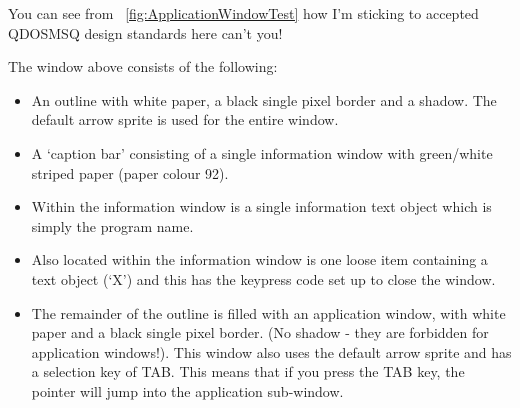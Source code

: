 You can see from \figurename~\ref{fig:ApplicationWindowTest} how I'm sticking to accepted QDOSMSQ design     standards here can't you!

The window above consists of the following:
\begin{itemize}[itemsep=0pt]

\item{}An outline with white paper, a black single pixel border and a
        shadow. The default arrow sprite is used for the entire window.

\item{}A `caption bar' consisting of a single information window with
        green/white striped paper (paper colour 92).

\item{}Within the information window is a single information text
        object which is simply the program name.

\item{}Also located within the information window is one loose item
        containing a text object (`X') and this has the keypress code set up
        to close the window.

\item{}The remainder of the outline is filled with an application
        window, with white paper and a black single pixel border. (No shadow -{}
        they are forbidden for application windows!). This window also uses
        the default arrow sprite and has a selection key of TAB. This means
        that if you press the TAB key, the pointer will jump into the
        application sub-{}window.

\end{itemize}


